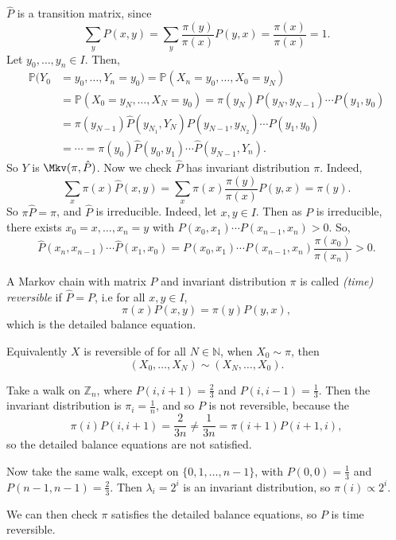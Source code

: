 \documentclass[12pt]{article}
\begin{document}
\begin{proofbox}
	$\hat P$ is a transition matrix, since
	\[
		\sum_{y} \hat P(x, y) = \sum_{y} \frac{\pi(y)}{\pi(x)} P(y, x) = \frac{\pi(x)}{\pi(x)} = 1.
	\]
	Let $y_0, \ldots, y_n \in I$. Then,
	\begin{align*}
		\mathbb{P}(Y_0 &= y_0, \ldots, Y_n = y_0) = \mathbb{P}(X_n = y_0, \ldots, X_0 = y_N) \\
			       &= \mathbb{P}(X_0 = y_N, \ldots, X_N = y_0) = \pi(y_N)P(y_N, y_{N-1})\cdots P(y_1, y_0) \\
			       &= \pi(y_{N-1})\hat P(y_{N_1}, Y_N) P(y_{N-1}, y_{N_2}) \cdots P(y_1, y_0) \\
			       &= \cdots = \pi(y_0) \hat P(y_0, y_1) \cdots \hat P(y_{N-1}, Y_n).
	\end{align*}
	So $Y$ is $\Mkv(\pi, \hat P)$. Now we check $\hat P$ has invariant distribution $\pi$. Indeed,
	\[
		\sum_{x} \pi(x) \hat P(x, y) = \sum_{x} \pi(x) \frac{\pi(y)}{\pi(x)}P(y, x) = \pi(y)
	.\]
	So $\pi \hat P = \pi$, and $\hat P$ is irreducible. Indeed, let $x, y\in I$. Then as $P$ is irreducible, there exists $x_0 = x, \ldots, x_n = y$ with $P(x_0, x_1) \cdots P(x_{n-1}, x_n) > 0$. So,
	\[
		\hat P(x_n, x_{n-1}) \cdots \hat P(x_1, x_0) = P(x_0, x_1) \cdots P(x_{n-1}, x_n) \frac{\pi(x_0)}{\pi(x_n)} > 0
	.\]
\end{proofbox}

\begin{definition}
	A Markov chain with matrix $P$ and invariant distribution $\pi$ is called \textit{(time) reversible} if $\hat P = P$, i.e for all $x, y \in I$,
	\[
		\pi(x) P(x, y) = \pi(y) P(y, x)
	,\]
	which is the detailed balance equation.

	Equivalently $X$ is reversible of for all $N \in \mathbb{N}$, when $X_0 \sim \pi$, then
	\[
		(X_0, \ldots, X_N) \sim (X_N, \ldots, X_0)
	.\]
\end{definition}

\begin{exbox}
	Take a walk on $\mathbb{Z}_n$, where $P(i, i+1) = \frac{2}{3}$ and $P(i, i-1) = \frac{1}{3}$. Then the invariant distribution is $\pi_i = \frac{1}{n}$, and so $P$ is not reversible, because the
	\[
		\pi(i) P(i, i+1) = \frac{2}{3n} \neq \frac{1}{3n} = \pi(i+1) P(i+1, i)
	,\]
	so the detailed balance equations are not satisfied.

	Now take the same walk, except on $\{0, 1, \ldots, n-1\}$, with $P(0,0) = \frac{1}{3}$ and $P(n-1,n-1) = \frac{2}{3}$. Then $\lambda_i = 2^{i}$ is an invariant distribution, so $\pi(i) \propto 2^{i}$.

	We can then check $\pi$ satisfies the detailed balance equations, so $P$ is time reversible.
\end{exbox}
\end{document}
